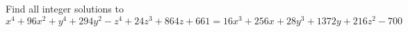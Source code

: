 Find all integer solutions to $$x^4 + 96x^2+ y^4 + 294y^2 - z^4 + 24z^3 + 864z + 661=16x^3+256x+28y^3+1372y+216z^2-700$$
